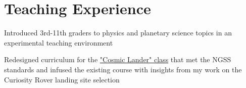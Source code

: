 \documentclass[letterpaper]{deedy-resume} %
\begin{document}
\begin{minipage}[t]{0.66\textwidth}
%
%
%
%
%
%
%
%


\section{Teaching Experience}


\vspace{\topsep} %
\begin{tightitemize}
\item Introduced 3rd-11th graders to physics and planetary science topics in an experimental teaching environment
\item Redesigned curriculum for the {\href{https://www.youtube.com/watch?v=t-3CwCxPF3I}{"Cosmic Lander" class}} that met the NGSS standards and infused the existing course with insights from my work on the Curiosity Rover landing site selection
\end{tightitemize}


\end{minipage}
\end{document}
